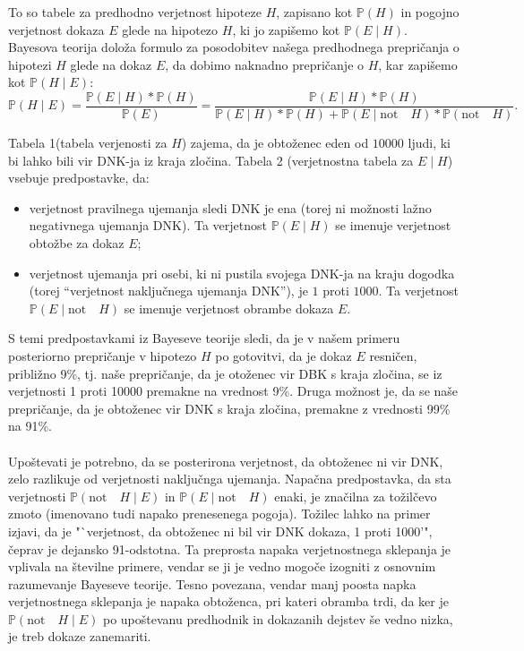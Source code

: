 \documentclass[a4paper,12pt]{article}
\begin{document}
To so tabele za predhodno verjetnost hipoteze $H$, zapisano kot $\mathbb{P}(H)$ in pogojno verjetnost dokaza $E$ glede na hipotezo $H$, ki 
jo zapišemo kot $\mathbb{P}(E \mid H)$. Bayesova teorija doloža formulo za posodobitev našega predhodnega prepričanja o hipotezi $H$ glede na 
dokaz $E$, da dobimo naknadno prepričanje o $H$, kar zapišemo kot $\mathbb{P}(H \mid E)$:
\[\mathbb{P}(H \mid E) = \frac{\mathbb{P}(E \mid H)*\mathbb{P}(H)}{\mathbb{P}(E)} = \frac{\mathbb{P}(E \mid H)*\mathbb{P}(H)}{\mathbb{P}(E \mid H)*\mathbb{P}(H) + \mathbb{P}(E \mid \text{not}\quad H)*\mathbb{P}(\text{not}\quad H)}.\]

Tabela 1(tabela verjenosti za $H$) zajema, da je obtoženec eden od $10000$ ljudi, ki bi lahko bili vir DNK-ja iz kraja zločina. Tabela 2 
(verjetnostna tabela za $E \mid H$) vsebuje predpostavke, da: 
\begin{itemize}
    \item verjetnost pravilnega ujemanja sledi DNK je ena (torej ni možnosti lažno negativnega ujemanja DNK). Ta verjetnost $\mathbb{P}(E \mid H)$ 
          se imenuje verjetnost obtožbe za dokaz $E$;
    \item verjetnost ujemanja pri osebi, ki ni pustila svojega DNK-ja na kraju dogodka (torej "`verjetnost naključnega ujemanja DNK"'), je $1$ 
          proti $1000$. Ta verjetnost $\mathbb{P}(E \mid \text{not}\quad H)$ se imenuje verjetnost obrambe dokaza $E$.
\end{itemize}

S temi predpostavkami iz Bayeseve teorije sledi, da je v našem primeru posteriorno prepričanje v hipotezo $H$ po gotovitvi, da je dokaz $E$ 
resničen, približno 9\%, tj. naše prepričanje, da je otoženec vir DBK s kraja zločina, se iz verjetnosti 1 proti 10000 premakne na vrednost 9\%. 
Druga možnost je, da se naše prepričanje, da je obtoženec vir DNK s kraja zločina, premakne z vrednosti 99\% na 91\%. \\ \\

Upoštevati je potrebno, da se posterirona verjetnost, da obtoženec ni vir DNK, zelo razlikuje od verjetnosti naključnga ujemanja. Napačna 
predpostavka, da sta verjetnosti $\mathbb{P}(\text{not}\quad H \mid E)$ in $\mathbb{P}(E \mid \text{not}\quad H)$ enaki, je značilna za 
tožilčevo zmoto (imenovano tudi napako prenesenega pogoja). Tožilec lahko na primer izjavi, da je "`verjetnost, da obtoženec ni bil vir DNK 
dokaza, 1 proti 1000'", čeprav je dejansko 91-odstotna. Ta preprosta napaka verjetnostnega sklepanja je vplivala na številne primere, vendar 
se ji je vedno mogoče izogniti z osnovnim razumevanje Bayeseve teorije. Tesno povezana, vendar manj poosta napka verjetnostnega sklepanja je 
napaka obtoženca, pri kateri obramba trdi, da ker je $\mathbb{P}(\text{not}\quad H \mid E)$ po upoštevanu predhodnik in dokazanih dejstev 
še vedno nizka, je treb dokaze zanemariti. \\ \\
\end{document}
